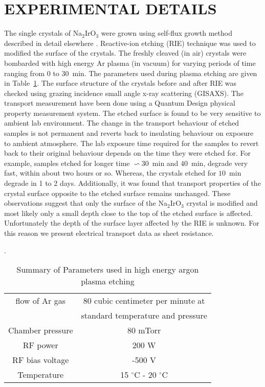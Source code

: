 \documentclass[aps,prb,twocolumn]{revtex4-1}
\begin{document}
\section{EXPERIMENTAL DETAILS}
\label{sec:EXPT}
The single crystals of Na$_{2}$IrO$ _{3} $ were grown using self-flux growth method described in detail elsewhere \cite{Singh2010}. Reactive-ion etching (RIE) technique was used to modified the surface of the crystals. The freshly cleaved (in air) crystals were bombarded with high energy Ar plasma (in vacuum) for varying periods of time ranging from $0$ to $30$~min. The parameters used during plasma etching are given in Table~\ref{Table-Etching-parameters}. The surface structure of the crystals before and after RIE was checked using grazing incidence small angle x-ray scattering (GISAXS). The transport measurement have been done using a Quantum Design physical property measurement system.  The etched surface is found to be very sensitive to ambient lab environment. The change in the transport behaviour of etched samples is not permanent and reverts back to insulating behaviour on exposure to ambient atmosphere. The lab exposure time required for the samples to revert back to their original behaviour depends on the time they were etched for. For example, samples etched for longer time $\backsim 30$~min and $40$~min, degrade very fast, within about two hours or so.  Whereas, the crystals etched for $10$~min degrade in 1 to 2 days. Additionally, it was found that transport properties of the crystal surface opposite to the etched surface remains unchanged.  These observations suggest that only the surface of the Na$_{2}$IrO$_{3}$ crystal is modified and most likely only a small depth close to the top of the etched surface is affected.  Unfortunately the depth of the surface layer affected by the RIE is unknown.  For this reason we present electrical transport data as sheet resistance. 
  
\begin{table}
\caption{Summary of Parameters  used in high energy argon plasma etching}. 
\begin{ruledtabular}
\begin{tabular}{|cc|}
flow of Ar gas & 80 cubic centimeter per minute at\\ %
&standard temperature and pressure \\ %
Chamber pressure  &  80 mTorr  \\ %
RF power & 200 W   \\ %
RF bias voltage & -500 V   \\ %
Temperature & 15 $^\circ$C - 20 $^\circ$C   \\ %
\end{tabular}
\end{ruledtabular}
\label{Table-Etching-parameters}
\end{table} 
 
\end{document}
